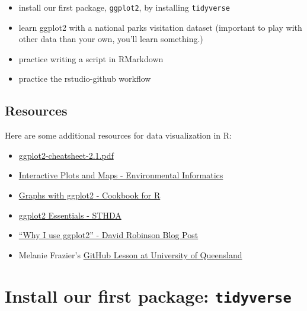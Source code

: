 \documentclass[]{book}
\providecommand{\tightlist}{%
  \setlength{\itemsep}{0pt}\setlength{\parskip}{0pt}}
\begin{document}
\begin{itemize}
\tightlist
\item
  install our first package, \texttt{ggplot2}, by installing \texttt{tidyverse}
\item
  learn ggplot2 with a national parks visitation dataset (important to play with other data than your own, you'll learn something.)
\item
  practice writing a script in RMarkdown
\item
  practice the rstudio-github workflow
\end{itemize}

\hypertarget{resources-4}{%
\subsection{Resources}\label{resources-4}}

Here are some additional resources for data visualization in R:

\begin{itemize}
\tightlist
\item
  \href{https://www.rstudio.com/wp-content/uploads/2016/11/ggplot2-cheatsheet-2.1.pdf}{ggplot2-cheatsheet-2.1.pdf}\\
\item
  \href{http://ucsb-bren.github.io/env-info/wk06_widgets.html}{Interactive Plots and Maps - Environmental Informatics}\\
\item
  \href{http://www.cookbook-r.com/Graphs/\#graphs-with-ggplot2}{Graphs with ggplot2 - Cookbook for R}\\
\item
  \href{http://www.sthda.com/english/wiki/ggplot2-essentials}{ggplot2 Essentials - STHDA}\\
\item
  \href{http://varianceexplained.org/r/why-I-use-ggplot2/}{``Why I use ggplot2'' - David Robinson Blog Post}
\item
  Melanie Frazier's \href{https://github.com/OHI-Science/data-science-training/blob/master/ggplot2_mel.Rmd}{GitHub Lesson at University of Queensland}
\end{itemize}

\hypertarget{install-our-first-package-tidyverse}{%
\section{\texorpdfstring{Install our first package: \texttt{tidyverse}}{Install our first package: tidyverse}}\label{install-our-first-package-tidyverse}}
\end{document}
